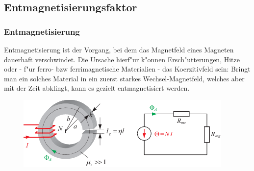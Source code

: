     \subsection{Entmagnetisierungsfaktor}

        \subsubsection*{Entmagnetisierung}
    		Entmagnetisierung ist der Vorgang, bei dem das Magnetfeld eines Magneten dauerhaft verschwindet.
            Die Ursache hierf"ur k"onnen Ersch"utterungen, Hitze oder - f"ur ferro- bzw ferrimagnetische Materialien - das Koerzitivfeld sein: Bringt man ein solches Material
            in ein zuerst starkes Wechsel-Magnetfeld, welches aber mit der Zeit abklingt, kann es gezielt entmagnetisiert werden.
            \begin{figure}[H]
                \centering
                \includegraphics{images/Ringkern}
            \end{figure}
